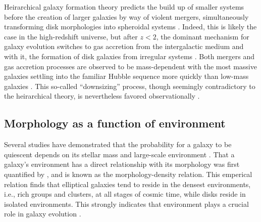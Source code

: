

Heirarchical galaxy formation theory predicts the build up of smaller systems before the creation of larger galaxies by way of violent mergers, simultaneously transforming disk morphologies into spheroidal systems \citep{Driver2013,Bluck2009,Man2012}. Indeed, this is likely the case in the high-redshift universe, but after $z<2$, the dominant mechanism for galaxy evolution switches to gas accretion from the intergalactic medium and with it, the formation of disk galaxies from irregular systems \citep{Conselice2013}. Both mergers and gas accretion processes are observed to be mass-dependent with the most massive galaxies settling into the familiar Hubble sequence more quickly than low-mass galaxies \citep{Buitrago2013,Conselice2011,Mortlock2013}. This so-called ``downsizing'' process, though seemingly contradictory to the heirarchical theory, is nevertheless favored observationally \citep{Cowie1996, Brinchmann2000, Bundy2005, Cimatti2006}. 



\subsection{Morphology as a function of environment}
\label{sec: morph and environment}

Several studies have demonstrated that the probability for a galaxy to be quiescent depends on its stellar mass and large-scale environment \citep{Balogh2004, Hogg2004, Peng2010, Woo2013}. That a galaxy's environment has a direct relationship with its morphology was first quantified by \cite{Dressler1980}, and is known as the morphology-density relation. This emperical relation finds that elliptical galaxies tend to reside in the densest environments, i.e., rich groups and clusters, at all stages of cosmic time, while disks reside in isolated environments. This strongly indicates that environment plays a crucial role in galaxy evolution \citep[e.g.,][]{Fasano2000, Smith2005, Peng2010}. 

